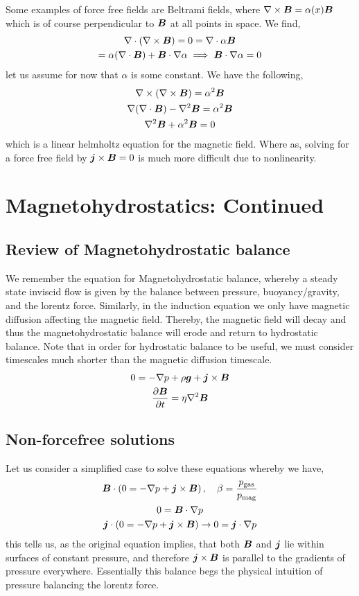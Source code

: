 \documentclass{article}
\begin{document}
Some examples of force free fields are Beltrami fields, where $\nabla\times\boldsymbol{B} =
\alpha(x) \boldsymbol{B}$ which is of course perpendicular to $\boldsymbol{B}$ at all points in space.
We find, 
\begin{gather*}
    \nabla\cdot(\nabla\times\boldsymbol{B}) = 0 = \nabla \cdot{\alpha\boldsymbol{B}} \\
    = \alpha(\nabla \cdot{\boldsymbol{B}}) + \boldsymbol{B}\cdot\nabla\alpha \implies \boldsymbol{B}\cdot\nabla\alpha = 0
\end{gather*}
let us assume for now that $\alpha$ is some constant. We have the following, 
\begin{gather*}
    \nabla\times(\nabla\times\boldsymbol{B}) = \alpha^2\boldsymbol{B}\\
    \nabla(\nabla\cdot\boldsymbol{B}) - \nabla^2\boldsymbol{B} = \alpha^2\boldsymbol{B}\\
    \nabla^2\boldsymbol{B} + \alpha^2\boldsymbol{B} = 0
\end{gather*}
which is a linear helmholtz equation for the magnetic field. Where as, solving
for a force free field by $\boldsymbol{j}\times\boldsymbol{B} = 0$ is much more difficult due to
nonlinearity. 

\section{Magnetohydrostatics: Continued}
\subsection{Review of Magnetohydrostatic balance}
We remember the equation for Magnetohydrostatic balance, whereby a steady state
inviscid flow is given by the balance between pressure, buoyancy/gravity, and
the lorentz force. Similarly, in the induction equation we only have magnetic
diffusion affecting the magnetic field. Thereby, the magnetic field will decay
and thus the magnetohydrostatic balance will erode and return to hydrostatic
balance. Note that in order for hydrostatic balance to be useful, we must
consider timescales much shorter than the magnetic diffusion timescale. 
\begin{gather*}
    0 = -\nabla p + \rho\boldsymbol{g} + \boldsymbol{j}\times\boldsymbol{B}\\
    \frac{\partial \boldsymbol{B}}{\partial t} = \eta\nabla^2\boldsymbol{B}
\end{gather*}

\subsection{Non-forcefree solutions}
Let us consider a simplified case to solve these equations whereby we have,
\begin{gather*}
    \boldsymbol{B}\cdot\left( 0 = -\nabla p + \boldsymbol{j}\times\boldsymbol{B}\right), \quad \beta =
    \frac{p_{\text{gas}}}{p_{\text{mag}}}\\
    0 = \boldsymbol{B}\cdot\nabla p\\
    \boldsymbol{j}\cdot\left( 0 = -\nabla p + \boldsymbol{j}\times\boldsymbol{B}\right) \to 0 =
    \boldsymbol{j}\cdot\nabla p
\end{gather*}
this tells us, as the original equation implies, that both $\boldsymbol{B}$ and $\boldsymbol{j}$ lie
within surfaces of constant pressure, and therefore $\boldsymbol{j}\times\boldsymbol{B}$ is parallel
to the gradients of pressure everywhere. Essentially this balance begs the
physical intuition of pressure balancing the lorentz force. 
\end{document}
